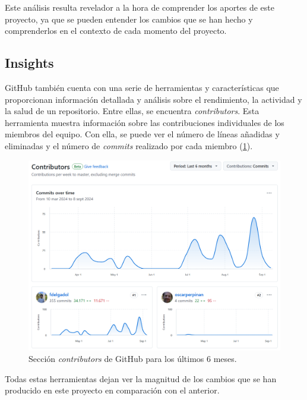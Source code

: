 Este análisis resulta revelador a la hora de comprender los aportes de este proyecto, ya que se pueden entender los cambios que se han hecho y comprenderlos en el contexto de cada momento del proyecto.

\subsection{Insights}
\label{sec:orgcb7a18e}
GitHub también cuenta con una serie de herramientas y características que proporcionan información detallada y análisis sobre el rendimiento, la actividad y la salud de un repositorio. Entre ellas, se encuentra \emph{contributors}. Esta herramienta muestra información sobre las contribuciones individuales de los miembros del equipo. Con ella, se puede ver el número de líneas añadidas y eliminadas y el número de \emph{commits} realizado por cada miembro (\ref{fig:contributors}).
\begin{figure}[htbp]
\centering
\includegraphics[width=.9\linewidth]{figuras/contributors.png}
\caption{Sección \emph{contributors} de GitHub para los últimos 6 meses. \label{fig:contributors}}
\end{figure}

Todas estas herramientas dejan ver la magnitud de los cambios que se han producido en este proyecto en comparación con el anterior.

